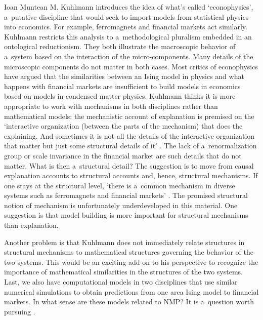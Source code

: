 \begin{recengenv}{Ioan Muntean}
\enlargethispage{1.5\baselineskip}
M. Kuhlmann introduces the idea of what's called ‘econophysics', a~putative discipline that would seek to import models from statistical physics into economics. For example, ferromagnets and financial markets act similarly. Kuhlmann restricts this analysis to a~methodological pluralism embedded in an ontological reductionism. They both illustrate the macroscopic behavior of a~system based on the interaction of the micro-components. Many details of the microscopic components do not matter in both cases. Most critics of econophysics have argued that the similarities between an Ising model in physics and what happens with financial markets are insufficient to build models in economics based on models in condensed matter physics. Kuhlmann thinks it is more appropriate to work with mechanisms in both disciplines rather than mathematical models: the mechanistic account of explanation is premised on the ‘interactive organization (between the parts of the mechanism) that does the explaining. And sometimes it is not all the details of the interactive organization that matter but just some structural details of it'
\parencite*[][p.195]{falkenburg_mechanistic_2019}. %
 The lack of a~renormalization group or scale invariance in the financial market are such details that do not matter. What is then a~structural detail? The suggestion is to move from causal explanation accounts to structural accounts and, hence, structural mechanisms. If one stays at the structural level, ‘there is a~common mechanism in diverse systems such as ferromagnets and financial markets' 
\parencite*[][p.198]{falkenburg_mechanistic_2019}. %
 The promised structural notion of mechanism is unfortunately underdeveloped in this material. One suggestion is that model building is more important for structural mechanisms than explanation.

Another problem is that Kuhlmann does not immediately relate structures in structural mechanisms to mathematical structures governing the behavior of the two systems. This would be an exciting add-on to his perspective to recognize the importance of mathematical similarities in the structures of the two systems. Last, we also have computational models in two disciplines that use similar numerical simulations to obtain predictions from one area Ising model to financial markets. In what sense are these models related to NMP? It is a~question worth pursuing
\parencite[see a~possible connection in][]{humphreys_knowledge_2019}.%



\end{recengenv}
